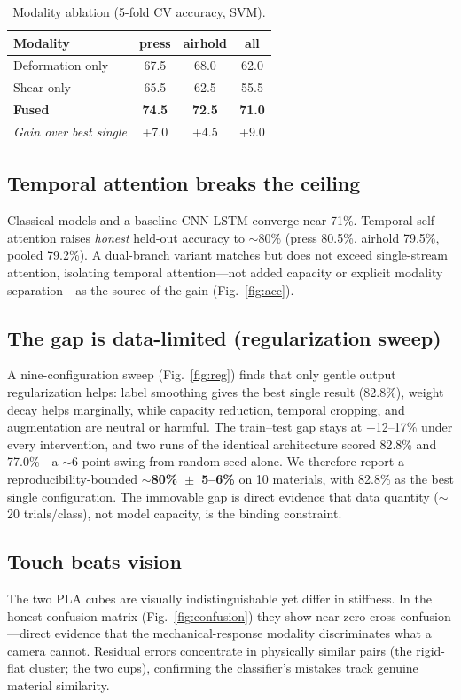 \documentclass[conference]{IEEEtran}
\begin{document}
\begin{table}[t]
\caption{Modality ablation (5-fold CV accuracy, SVM).}
\label{tab:mod}
\centering
\begin{tabular}{lccc}
\toprule
Modality & press & airhold & all \\
\midrule
Deformation only & 67.5 & 68.0 & 62.0 \\
Shear only & 65.5 & 62.5 & 55.5 \\
\textbf{Fused} & \textbf{74.5} & \textbf{72.5} & \textbf{71.0} \\
\midrule
\emph{Gain over best single} & +7.0 & +4.5 & +9.0 \\
\bottomrule
\end{tabular}
\end{table}

\subsection{Temporal attention breaks the ceiling}
Classical models and a baseline CNN-LSTM converge near 71\%. Temporal
self-attention raises \emph{honest} held-out accuracy to $\sim$80\%
(press 80.5\%, airhold 79.5\%, pooled 79.2\%). A dual-branch variant matches but
does not exceed single-stream attention, isolating temporal attention---not
added capacity or explicit modality separation---as the source of the gain
(Fig.~\ref{fig:acc}).

\subsection{The gap is data-limited (regularization sweep)}
A nine-configuration sweep (Fig.~\ref{fig:reg}) finds that only gentle output
regularization helps: label smoothing gives the best single result (82.8\%),
weight decay helps marginally, while capacity reduction, temporal cropping, and
augmentation are neutral or harmful. The train--test gap stays at +12--17\%
under every intervention, and two runs of the identical architecture scored
82.8\% and 77.0\%---a $\sim$6-point swing from random seed alone. We therefore
report a reproducibility-bounded \textbf{$\sim$80\%~$\pm$~5--6\%} on 10
materials, with 82.8\% as the best single configuration. The immovable gap is
direct evidence that data quantity ($\sim$20 trials/class), not model capacity,
is the binding constraint.

\subsection{Touch beats vision}
The two PLA cubes are visually indistinguishable yet differ in stiffness. In the
honest confusion matrix (Fig.~\ref{fig:confusion}) they show near-zero
cross-confusion---direct evidence that the mechanical-response modality
discriminates what a camera cannot. Residual errors concentrate in
physically similar pairs (the rigid-flat cluster; the two cups), confirming the
classifier's mistakes track genuine material similarity.
\end{document}
